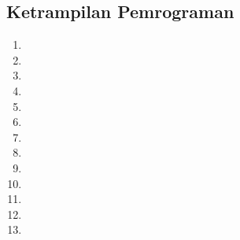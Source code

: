     \newpage			
	\subsection{Ketrampilan Pemrograman}
			\begin{enumerate}
				\item 
				\item 
				\item 
				\item 
				\item 
				\item 
				\item 
				\item 
				\item 
				\item 
				\item 
				\item 
				\item 
	
\end{enumerate}